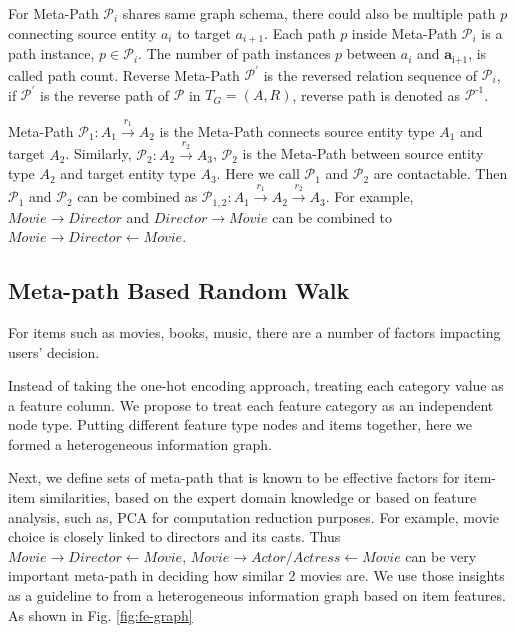 For Meta-Path $\mathcal{P}_i$ shares same graph schema, there could also be multiple path $p$ connecting source entity $a_i$ to target ${a}_{i+1}$. Each path $p$ inside Meta-Path $\mathcal{P}_i$ is a path instance, $p \in \mathcal{P}_i$. The number of path instances $p$ between $a_i$ and $\bm{a}_\text{i+1}$, is called path count. Reverse Meta-Path $\mathcal{P}^{'}$ is the reversed relation sequence of $\mathcal{P}_i$, if $\mathcal{P}^{'}$ is the reverse path of $\mathcal{P}$ in $T_G = (A, R)$, reverse path is denoted as $\mathcal{P}^\text{-1}$. \newline

Meta-Path $\mathcal{P}_1: A_1 \xrightarrow{r_1} A_2$ is the Meta-Path connects source entity type $A_1$ and target $A_2$.
Similarly, $\mathcal{P}_2: A_2 \xrightarrow{r_2} A_3$, $\mathcal{P}_2$ is the Meta-Path between source entity type $A_\text{2}$ and target entity type $A_\text{3}$.
Here we call $\mathcal{P}_1$ and $\mathcal{P}_2$ are contactable. Then $\mathcal{P}_1$ and $\mathcal{P}_2$ can be combined as $\mathcal{P}_{1,2}: A_1 \xrightarrow{r_1} A_2 \xrightarrow{r_2} A_3$. For example, $Movie \rightarrow Director$ and $Director \rightarrow Movie$ can be combined to $Movie \rightarrow Director \leftarrow Movie$. 

\subsection{Meta-path Based Random Walk}\label{3MF}

For items such as movies, books, music, there are a number of factors impacting users' decision. 

Instead of taking the one-hot encoding approach, treating each category value as a feature column. We propose to treat each feature category as an independent node type. Putting different feature type nodes and items together, here we formed a heterogeneous information graph. 

Next, we define sets of meta-path that is known to be effective factors for item-item similarities, based on the expert domain knowledge or based on feature analysis, such as, PCA for computation reduction purposes. For example, movie choice is closely linked to directors and its casts. Thus $Movie \rightarrow Director \leftarrow Movie$, $Movie \rightarrow Actor/Actress \leftarrow Movie$  can be very important meta-path in deciding how similar 2 movies are. We use those insights as a guideline to from a heterogeneous information graph based on item features. As shown in Fig. \ref{fig:fe-graph}


